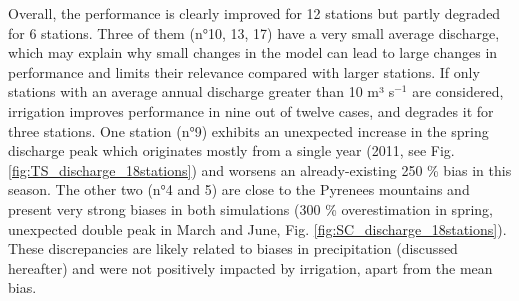 Overall, the performance is clearly improved for 12 stations but partly degraded for 6 stations. Three of them (n°10, 13, 17) have a very small average discharge, which may explain why small changes in the model can lead to large changes in performance and limits their relevance compared with larger stations. If only stations with an average annual discharge greater than 10 m³ s$^{-1}$ are considered, irrigation improves performance in nine out of twelve cases, and degrades it for three stations. One station (n°9) exhibits an unexpected increase in the spring discharge peak which originates mostly from a single year (2011, see Fig. \ref{fig:TS_discharge_18stations}) and worsens an already-existing 250 \% bias in this season. The other two (n°4 and 5) are close to the Pyrenees mountains and present very strong biases in both simulations (300 \% overestimation in spring, unexpected double peak in March and June, Fig. \ref{fig:SC_discharge_18stations}). These discrepancies are likely related to biases in precipitation (discussed hereafter) and were not positively impacted by irrigation, apart from the mean bias.


